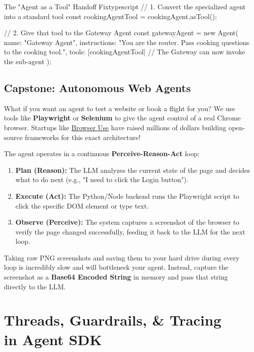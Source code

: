 \documentclass[12pt,a4paper,oneside]{book}
\begin{document}
\begin{codeblock}{The "Agent as a Tool" Handoff Fix}{typescript}
// 1. Convert the specialized agent into a standard tool
const cookingAgentTool = cookingAgent.asTool();

// 2. Give that tool to the Gateway Agent
const gatewayAgent = new Agent({
    name: "Gateway Agent",
    instructions: "You are the router. Pass cooking questions to the cooking tool.",
    tools: [cookingAgentTool] // The Gateway can now invoke the sub-agent
});
\end{codeblock}

\section{Capstone: Autonomous Web Agents}
What if you want an agent to test a website or book a flight for you? We use tools like \textbf{Playwright} or \textbf{Selenium} to give the agent control of a real Chrome browser. Startups like \href{https://github.com/browser-use/browser-use}{Browser Use} have raised millions of dollars building open-source frameworks for this exact architecture!

The agent operates in a continuous \textbf{Perceive-Reason-Act} loop:
\begin{enumerate}
	\item \textbf{Plan (Reason):} The LLM analyzes the current state of the page and decides what to do next (e.g., "I need to click the Login button").
	\item \textbf{Execute (Act):} The Python/Node backend runs the Playwright script to click the specific DOM element or type text.
	\item \textbf{Observe (Perceive):} The system captures a screenshot of the browser to verify the page changed successfully, feeding it back to the LLM for the next loop.
\end{enumerate}

\begin{bestpractice}
	Taking raw PNG screenshots and saving them to your hard drive during every loop is incredibly slow and will bottleneck your agent. Instead, capture the screenshot as a \textbf{Base64 Encoded String} in memory and pass that string directly to the LLM.
\end{bestpractice}

\chapter[Threads \& Guardrails]{Threads, Guardrails, \& Tracing\\in Agent SDK}
\end{document}
